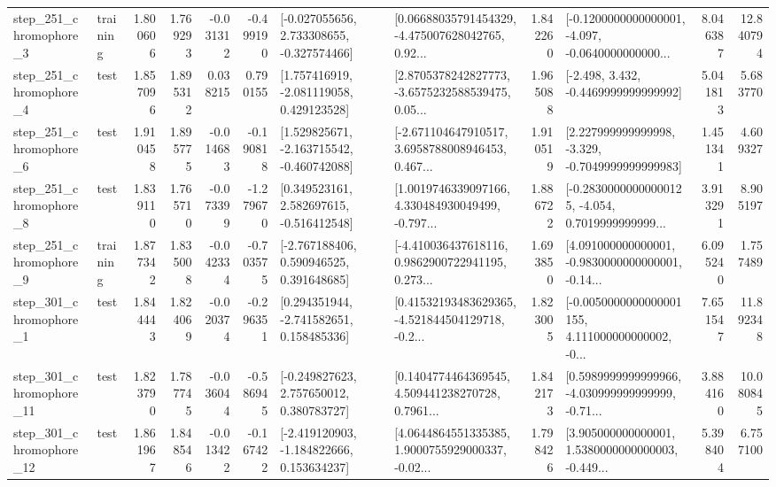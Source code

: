 \begin{tabular}{llrrrrllrlrr}
   step\_251\_chromophore\_3 &  training &      1.800606 &    1.769293 &     -0.031312 & -0.499190 &   [-0.027055656, 2.733308655, -0.327574466] &  [0.06688035791454329, -4.475007628042765, 0.92... &       1.842260 &  [-0.1200000000000001, -4.097, -0.0640000000000... &            8.046387 &         12.840794 \\
   step\_251\_chromophore\_4 &      test &      1.857096 &    1.895312 &      0.038215 &  0.790155 &    [1.757416919, -2.081119058, 0.429123528] &  [2.8705378242827773, -3.6575232588539475, 0.05... &       1.965088 &               [-2.498, 3.432, -0.4469999999999992] &            5.041813 &          5.683770 \\
   step\_251\_chromophore\_6 &      test &      1.910458 &    1.895775 &     -0.014683 & -0.190818 &   [1.529825671, -2.163715542, -0.460742088] &  [-2.671104647910517, 3.6958788008946453, 0.467... &       1.910519 &   [2.227999999999998, -3.329, -0.7049999999999983] &            1.451341 &          4.609327 \\
   step\_251\_chromophore\_8 &      test &      1.839110 &    1.765710 &     -0.073399 & -1.279670 &    [0.349523161, 2.582697615, -0.516412548] &  [1.0019746339097166, 4.330484930049499, -0.797... &       1.886722 &  [-0.28300000000000125, -4.054, 0.7019999999999... &            3.913291 &          8.905197 \\
   step\_251\_chromophore\_9 &  training &      1.877342 &    1.835008 &     -0.042334 & -0.703575 &    [-2.767188406, 0.590946525, 0.391648685] &  [-4.410036437618116, 0.9862900722941195, 0.273... &       1.693850 &  [4.091000000000001, -0.9830000000000001, -0.14... &            6.095240 &          1.757489 \\
   step\_301\_chromophore\_1 &      test &      1.844443 &    1.824069 &     -0.020374 & -0.296351 &    [0.294351944, -2.741582651, 0.158485336] &  [0.41532193483629365, -4.521844504129718, -0.2... &       1.823005 &  [-0.0050000000000001155, 4.111000000000002, -0... &            7.651547 &         11.892348 \\
  step\_301\_chromophore\_11 &      test &      1.823790 &    1.787745 &     -0.036044 & -0.586945 &    [-0.249827623, 2.757650012, 0.380783727] &  [0.1404774464369545, 4.509441238270728, 0.7961... &       1.842173 &  [0.5989999999999966, -4.030999999999999, -0.71... &            3.884160 &         10.080845 \\
  step\_301\_chromophore\_12 &      test &      1.861967 &    1.848546 &     -0.013422 & -0.167422 &   [-2.419120903, -1.184822666, 0.153634237] &  [4.0644864551335385, 1.9000755929000337, -0.02... &       1.798426 &  [3.905000000000001, 1.5380000000000003, -0.449... &            5.398404 &          6.757100 \\

\end{tabular}
